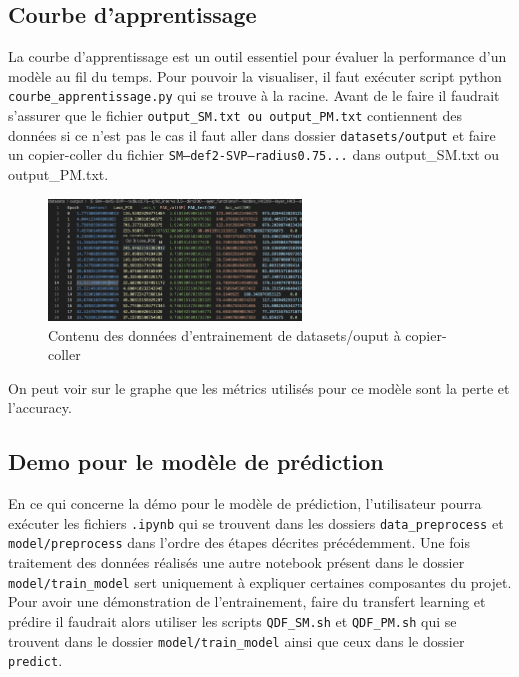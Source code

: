 \subsection{Courbe d'apprentissage}

La courbe d'apprentissage est un outil essentiel pour évaluer la performance d'un modèle au fil du temps. 
Pour pouvoir la visualiser, il faut exécuter script python \texttt{courbe\_apprentissage.py} qui se trouve à la racine. 
Avant de le faire il faudrait s'assurer que le fichier \texttt{output\_SM.txt ou output\_PM.txt} contiennent des données si ce n'est pas le cas il faut aller dans dossier \texttt{datasets/output} et faire un copier-coller du fichier \texttt{SM--def2-SVP--radius0.75...} dans output\_SM.txt ou output\_PM.txt.

\begin{figure}[H]
  \centering
  \includegraphics[width=0.6\textwidth]{GuideUtilisateur/train2.png}
  \caption{Contenu des données d'entrainement de datasets/ouput à copier-coller}
\end{figure}

On peut voir sur le graphe que les métrics utilisés pour ce modèle sont la perte et l'accuracy.

\subsection{Demo pour le modèle de prédiction}

En ce qui concerne la démo pour le modèle de prédiction, l'utilisateur pourra exécuter les fichiers \texttt{.ipynb} qui se trouvent dans les dossiers \texttt{data\_preprocess} et \texttt{model/preprocess} dans l'ordre des étapes décrites précédemment.
Une fois traitement des données réalisés une autre notebook présent dans le dossier \texttt{model/train\_model} sert uniquement à expliquer certaines composantes du projet. 
Pour avoir une démonstration de l'entrainement, faire du transfert learning et prédire il faudrait alors utiliser les scripts \texttt{QDF\_SM.sh} et \texttt{QDF\_PM.sh} qui se trouvent dans le dossier \texttt{model/train\_model} ainsi que ceux dans le dossier \texttt{predict}.

